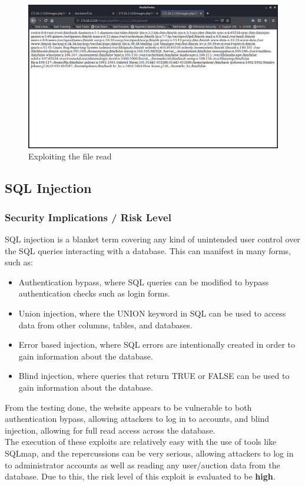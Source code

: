 \documentclass{report}
\begin{document}
\begin{figure}
	\centering
	\includegraphics[scale=0.4]{img/pathtraversal3.png}
	\caption{Exploiting the file read}
\end{figure}
\pagebreak
\subsection{SQL Injection}
\subsubsection{Security Implications / Risk Level}
SQL injection is a blanket term covering any kind of unintended user control over the SQL queries interacting with a database. This can manifest in many forms, such as:
\begin{itemize}
	\item Authentication bypass, where SQL queries can be modified to bypass authentication checks such as login forms.
	\item Union injection, where the UNION keyword in SQL can be used to access data from other columns, tables, and databases.
	\item Error based injection, where SQL errors are intentionally created in order to gain information about the database.
	\item Blind injection, where queries that return TRUE or FALSE can be used to gain information about the database.
\end{itemize}
From the testing done, the website appears to be vulnerable to both authentication bypass, allowing attackers to log in to accounts, and blind injection, allowing for full read access across the database.\\
The execution of these exploits are relatively easy with the use of tools like SQLmap, and the repercussions can be very serious, allowing attackers to log in to administrator accounts as well as reading any user/auction data from the database. Due to this, the risk level of this exploit is evaluated to be \textbf{high}.
\end{document}
